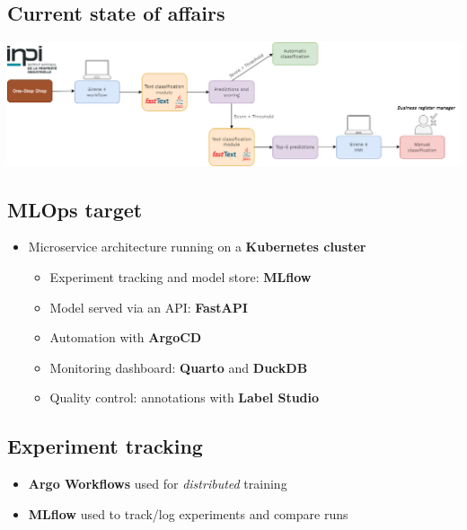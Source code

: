\documentclass[
  letterpaper,
  DIV=11,
  numbers=noendperiod]{scrartcl}
\providecommand{\tightlist}{%
  \setlength{\itemsep}{0pt}\setlength{\parskip}{0pt}}\usepackage{longtable,booktabs,array}
\begin{document}
\subsection{Current state of affairs}\label{current-state-of-affairs-1}

\begin{center}
\includegraphics{../img/orga-post-prod-sirene4-en.png}
\end{center}

\subsection{MLOps target}\label{mlops-target}

\begin{itemize}
\tightlist
\item
  Microservice architecture running on a {\textbf{Kubernetes cluster}}

  \begin{itemize}
  \tightlist
  \item
    Experiment tracking and model store: {\textbf{MLflow}}
  \item
    Model served via an API: {\textbf{FastAPI}}
  \item
    Automation with {\textbf{ArgoCD}}
  \item
    Monitoring dashboard: {\textbf{Quarto}} and {\textbf{DuckDB}}
  \item
    Quality control: annotations with {\textbf{Label Studio}}
  \end{itemize}
\end{itemize}

\subsection{Experiment tracking}\label{experiment-tracking}

\begin{itemize}
\tightlist
\item
  {\textbf{Argo Workflows}} used for \emph{distributed} training
\item
  {\textbf{MLflow}} used to track/log experiments and compare runs
\end{itemize}
\end{document}
